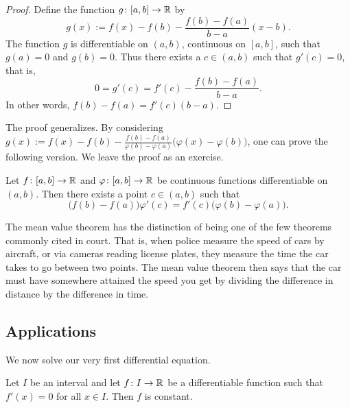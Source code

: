 \begin{proof}
Define the
function $g \colon [a,b] \to {\mathbb{R}}$ by
\begin{equation*}
g(x) := f(x)-f(b)-\frac{f(b)-f(a)}{b-a}(x-b) .
\end{equation*}
The function $g$ is differentiable on $(a,b)$,
continuous on $[a,b]$, such that $g(a) = 0$ and $g(b) = 0$.  Thus there exists
a
$c \in (a,b)$ such that $g'(c) = 0$, that is,
\begin{equation*}
0 = g'(c) = f'(c)-\frac{f(b)-f(a)}{b-a} .
\end{equation*}
In other words,
$f(b)-f(a) = f'(c)(b-a)$.
\end{proof}

The proof generalizes.  By considering
$g(x) :=
f(x)-f(b)-\frac{f(b)-f(a)}{\varphi(b)-\varphi(a)}\bigl(\varphi(x)-\varphi(b)\bigr)$,
one can prove the following version.  We leave the proof as an exercise.

\begin{thm} \label{thm:cauchymvt}
Let $f \colon [a,b] \to {\mathbb{R}}$ and $\varphi \colon [a,b] \to {\mathbb{R}}$ be continuous
functions
differentiable on $(a,b)$.  Then there exists a point $c \in (a,b)$
such that
\begin{equation*}
\bigl(f(b)-f(a)\bigr)\varphi'(c) = f'(c)\bigl(\varphi(b)-\varphi(a)\bigr) .
\end{equation*}
\end{thm}

The mean value theorem has the distinction of being one of the few theorems
commonly cited
in court.  That is, when police measure the speed of cars by aircraft, or
via cameras reading license plates, they 
measure the time the car takes to go between two points.
The mean value theorem then
says that the car must have somewhere attained the speed you get by dividing the
difference in distance by the difference in time.



\subsection{Applications}

We now solve our very first differential equation.

\begin{prop} \label{prop:derzeroconst}
Let $I$ be an interval and
let $f \colon I \to {\mathbb{R}}$ be a differentiable function such that $f'(x) = 0$
for all $x \in I$.
Then $f$ is constant.
\end{prop}


